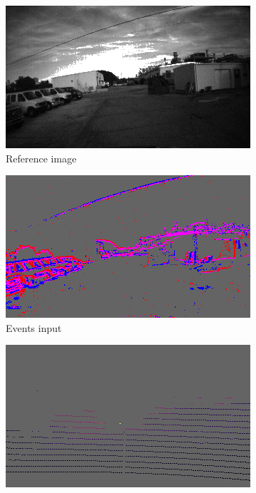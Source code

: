 \begin{figure}
  \centering
  \begin{subfigure}{0.31\textwidth}
    \centering
    \includegraphics[width=\textwidth]{mainmatter/figures/4_depth_conv/mvsec_cmp/img.png}
    \caption{Reference image}
  \end{subfigure}
  \hfill
  \begin{subfigure}{0.31\textwidth}
    \centering
    \includegraphics[width=\textwidth]{mainmatter/figures/4_depth_conv/mvsec_cmp/evts_ours_cropped_lightgray_fixed.png}
    \caption{Events input}
  \end{subfigure}
  \hfill
  \begin{subfigure}{0.31\textwidth}
    \centering
    \includegraphics[width=\textwidth]{mainmatter/figures/4_depth_conv/mvsec_cmp/lidar_cropped_lightgray_fixed.png}

\end{subfigure}
\end{figure}
